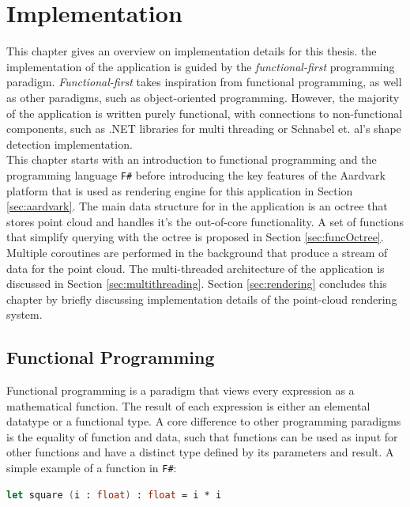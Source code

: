 \chapter{Implementation}
\label{chap:implementation}

This chapter gives an overview on implementation details for this thesis. the implementation of the application is guided by the \textit{functional-first} programming paradigm. \textit{Functional-first} takes inspiration from functional programming, as well as other paradigms, such as object-oriented programming. However, the majority of the application is written purely functional, with connections to non-functional components, such as .NET libraries for multi threading or Schnabel et. al's shape detection implementation\cite{schnabel-2007-software}. 
\\
This chapter starts with an introduction to functional programming and the programming language \verb|F#|\cite{FSharp} before introducing the key features of the Aardvark platform\cite{aardvark} that is used as rendering engine for this application in Section \ref{sec:aardvark}. The main data structure for in the application is an octree that stores point cloud and handles it's the out-of-core functionality. A set of functions that simplify querying with the octree is proposed in Section \ref{sec:funcOctree}. 
\\
Multiple coroutines are performed in the background that produce a stream of data for the point cloud. The multi-threaded architecture of the application is discussed in Section \ref{sec:multithreading}. Section \ref{sec:rendering} concludes this chapter by briefly discussing implementation details of the point-cloud rendering system. 


\section{Functional Programming}
\label{sec:funprog}

Functional programming is a paradigm that views every expression as a mathematical function. The result of each expression is either an elemental datatype or a functional type. A core difference to other programming paradigms is the equality of function and data, such that functions can be used as input for other functions and have a distinct type defined by its parameters and result. A simple example of a function in \verb|F#|: 

\begin{lstlisting}[language=FSharp]
let square (i : float) : float = i * i 
\end{lstlisting}

